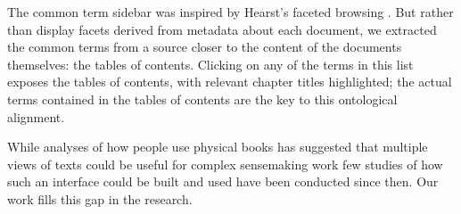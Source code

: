 The common term sidebar was inspired by Hearst's faceted browsing \cite{facets}. But rather than display facets derived from metadata about each document, we extracted the common terms from a source closer to the content of the documents themselves: the tables of contents. Clicking on any of the terms in this list exposes the tables of contents, with relevant chapter titles highlighted; the actual terms contained in the tables of contents are the key to this ontological alignment.

While analyses of how people use physical books has suggested that multiple views of texts could be useful for complex sensemaking work \cite{ohara,adler} few studies of how such an interface could be built and used have been conducted since then. Our work fills this gap in the research.
